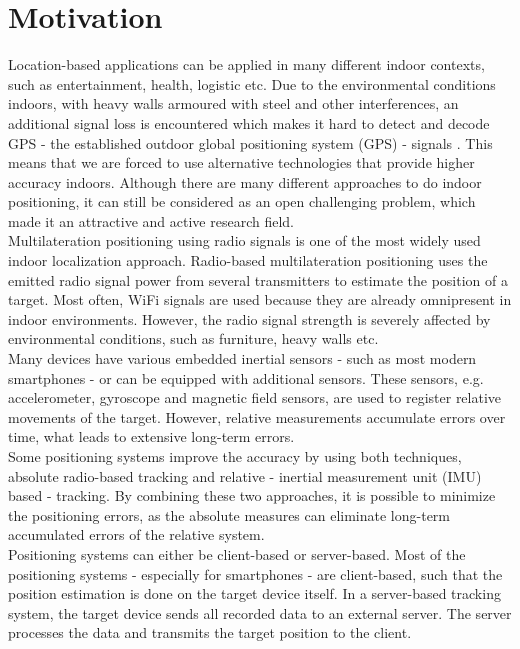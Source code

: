 \section{Motivation}
Location-based applications can be applied in many different indoor contexts, such as entertainment, health, logistic etc. Due to the environmental conditions indoors, with heavy walls armoured with steel and other interferences, an additional signal loss is encountered which makes it hard to detect and decode GPS - the established outdoor global positioning system (GPS) - signals \cite{GPSforIndoor}. This means that we are forced to use alternative technologies that provide higher accuracy indoors. Although there are many different approaches to do indoor positioning, it can still be considered as an open challenging problem, which made it an attractive and active research field.\\
\noindent\hspace*{5mm}%
Multilateration positioning using radio signals is one of the most widely used indoor localization approach. Radio-based multilateration positioning uses the emitted radio signal power from several transmitters to estimate the position of a target. Most often, WiFi signals are used because they are already omnipresent in indoor environments. However, the radio signal strength is severely affected by environmental conditions, such as furniture, heavy walls etc.\\
\noindent\hspace*{5mm}%
Many devices have various embedded inertial sensors - such as most modern smartphones - or can be equipped with additional sensors. These sensors, e.g. accelerometer, gyroscope and magnetic field sensors, are used to register relative movements of the target. However, relative measurements accumulate errors over time, what leads to extensive long-term errors.\\
\noindent\hspace*{5mm}%
Some positioning systems improve the accuracy by using both techniques, absolute radio-based tracking and relative - inertial measurement unit (IMU) based - tracking. By combining these two approaches, it is possible to minimize the positioning errors, as the absolute measures can eliminate long-term accumulated errors of the relative system. \\
\noindent\hspace*{5mm}%
Positioning systems can either be client-based or server-based. Most of the positioning systems - especially for smartphones - are client-based, such that the position estimation is done on the target device itself. In a server-based tracking system, the target device sends all recorded data to an external server. The server processes the data and transmits the target position to the client. \\
